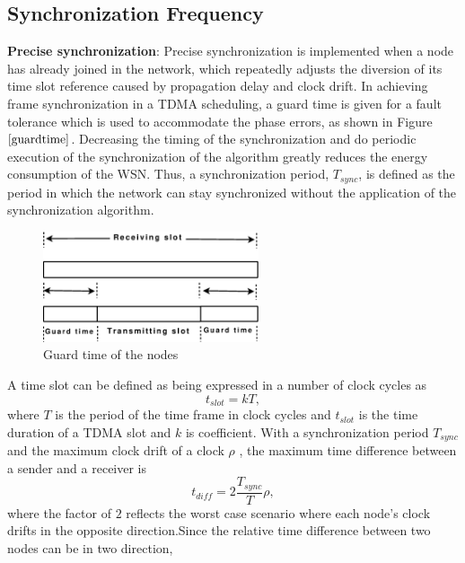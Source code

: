 \documentclass[journal]{IEEEtran}
\begin{document}
\subsection{\textbf{Synchronization Frequency}}
\noindent \textbf{Precise synchronization}: Precise synchronization is implemented when a node has already joined in the network, which repeatedly adjusts the diversion of its time slot reference caused by propagation delay and clock drift. \newline \noindent
In achieving frame synchronization in a TDMA scheduling, a guard time is given for a fault tolerance which is used to accommodate the
phase errors, as shown in Figure $\ref{guardtime}$. 
\newline \noindent
Decreasing the timing of the synchronization and do periodic execution of the synchronization of the algorithm greatly reduces
the energy consumption of the WSN. Thus, a synchronization period, $T_{sync}$, is defined as the period in which the network can stay synchronized without the application of the synchronization algorithm.
\begin{figure}
\centering
\includegraphics[width=2.5in]{guardtime}
\caption{Guard time of the nodes} \label{guardtime}
\end{figure}
\newline A time slot can be defined as being expressed in a
number of clock cycles as
\begin{equation}
t_{slot} = kT ,
\end{equation} where $T$ is the period of the time frame in clock cycles and
$t_{slot}$ is the time duration of a TDMA slot and $k$ is coefficient.
\newline With a synchronization period $T_{sync}$ and the
maximum clock drift of a clock $\rho$ , the maximum time difference
between a sender and a receiver is
\begin{equation}
t_{diff} = 2\frac{T_{sync}}{T}\rho ,
\end{equation}
where the factor of $2$ reflects the worst case scenario where each
node's clock drifts in the opposite direction.\newline Since the
relative time difference between two nodes can be in two direction,
\end{document}
